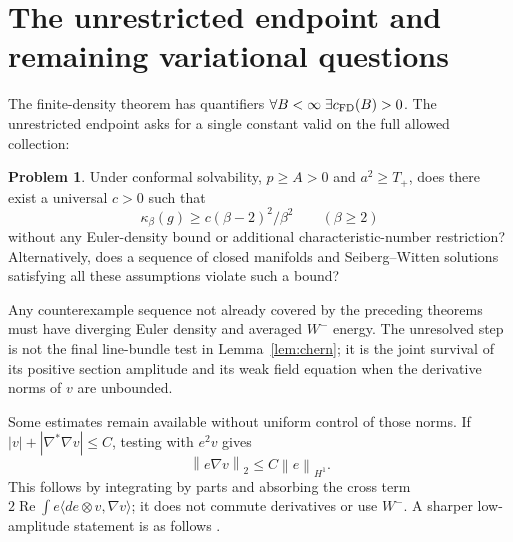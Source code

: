 \documentclass[11pt,a4paper]{article}
\theoremstyle{definition}
\newtheorem{problem}[theorem]{Problem}
\theoremstyle{remark}
\newcommand{\norm}[1]{\left\lVert#1\right\rVert}
\begin{document}
\section{The unrestricted endpoint and remaining variational questions}
The finite-density theorem has quantifiers $\forall B<\infty\;\exists c_{\rm FD}(B)>0$. The unrestricted endpoint asks for a single constant valid on the full allowed collection:
\begin{problem}\label{prob:O10}
Under conformal solvability, $p\ge A>0$ and $a^2\ge T_+$, does there exist a universal $c>0$ such that
\[
 \kappa_\beta(g)\ge c(\beta-2)^2/\beta^2\qquad(\beta\ge2)
\]
without any Euler-density bound or additional characteristic-number restriction? Alternatively, does a sequence of closed manifolds and Seiberg--Witten solutions satisfying all these assumptions violate such a bound?
\end{problem}
Any counterexample sequence not already covered by the preceding theorems must have diverging Euler density and averaged $W^-$ energy. The unresolved step is not the final line-bundle test in Lemma~\ref{lem:chern}; it is the joint survival of its positive section amplitude and its weak field equation when the derivative norms of $v$ are unbounded.

Some estimates remain available without uniform control of those norms. If $|v|+|\nabla^*\nabla v|\le C$, testing with $e^2v$ gives
\begin{equation}
 \norm{e\nabla v}_2\le C\norm e_{H^1}.
 \label{eq:weighted}
\end{equation}
This follows by integrating by parts and absorbing the cross term
$2\operatorname{Re}\int e\langle de\otimes v,\nabla v\rangle$; it does not commute derivatives or use $W^-$. A sharper low-amplitude statement is as follows \cite{LowAmplitude}.
\end{document}
